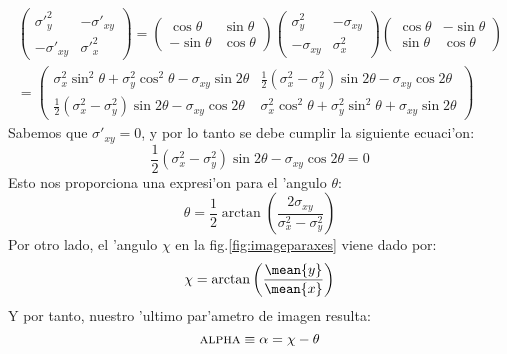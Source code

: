 \begin{multline}
  \label{eq:rotexplicit}
  \begin{pmatrix}
    {\sigma'}_y^2 & -{\sigma'}_{xy} \\ -{\sigma'}_{xy} & {\sigma'}_x^2
  \end{pmatrix}
  =
  \begin{pmatrix}
    \cos\theta & \sin\theta \\ -\sin\theta & \cos\theta
  \end{pmatrix}
  \begin{pmatrix}
    \sigma_y^2 & -\sigma_{xy} \\ -\sigma_{xy} & \sigma_x^2
  \end{pmatrix}
  \begin{pmatrix}
    \cos\theta & -\sin\theta \\ \sin\theta & \cos\theta
  \end{pmatrix} \\
  =
  \begin{pmatrix}
    \sigma_x^2 \sin^2\theta + \sigma_y^2 \cos^2\theta 
    - \sigma_{xy} \sin2\theta&
    \frac{1}{2}(\sigma_x^2 - \sigma_y^2)\sin2\theta  
    - \sigma_{xy}\cos2\theta \\
    \frac{1}{2}(\sigma_x^2 - \sigma_y^2)\sin2\theta 
    - \sigma_{xy}\cos2\theta &
    \sigma_x^2 \cos^2\theta + \sigma_y^2 \sin^2\theta 
    + \sigma_{xy} \sin2\theta
  \end{pmatrix}
\end{multline}
%
Sabemos que ${\sigma'}_{xy} = 0$, y por lo tanto se debe cumplir la
siguiente ecuaci'on:
%
\begin{equation}
  \label{eq:sigmapxy}
  \frac{1}{2}(\sigma_x^2 - \sigma_y^2)\sin2\theta  
    - \sigma_{xy}\cos2\theta = 0
\end{equation}
%
Esto nos proporciona una expresi'on para el 'angulo $\theta$:
%
\begin{equation}
  \label{eq:theta}
  \theta = \frac{1}{2} \arctan 
  \left(\frac{2\sigma_{xy}}{\sigma_x^2 - \sigma_y^2}\right)
\end{equation}
%
Por otro lado, el 'angulo $\chi$ en la fig.\ref{fig:imageparaxes}
viene dado por:
%
\begin{equation}
  \label{eq:chi}
  \chi = \arctan\left(\frac{\mean{y}}{\mean{x}}\right)
\end{equation}
%
Y por tanto, nuestro 'ultimo par'ametro de imagen resulta:
%
\begin{equation}
  \label{eq:alpha}
  \text{\scshape alpha} \equiv \alpha = \chi - \theta
\end{equation}


